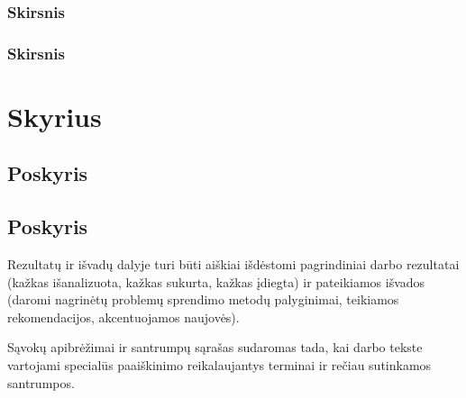 \documentclass{VUMIFPSkursinis}
\begin{document}
\subsubsection{Skirsnis}
\subsubsection{Skirsnis}
\section{Skyrius}
\subsection{Poskyris}
\subsection{Poskyris}

Rezultatų ir išvadų dalyje turi būti aiškiai išdėstomi pagrindiniai darbo
rezultatai (kažkas išanalizuota, kažkas sukurta, kažkas įdiegta) ir pateikiamos
išvados (daromi nagrinėtų problemų sprendimo metodų palyginimai, teikiamos
rekomendacijos, akcentuojamos naujovės).


\printbibliography[heading=bibintoc, title=Šaltiniai]  %

Sąvokų apibrėžimai ir santrumpų sąrašas sudaromas tada, kai darbo tekste
vartojami specialūs paaiškinimo reikalaujantys terminai ir rečiau sutinkamos
santrumpos.

\appendix  %
\end{document}
